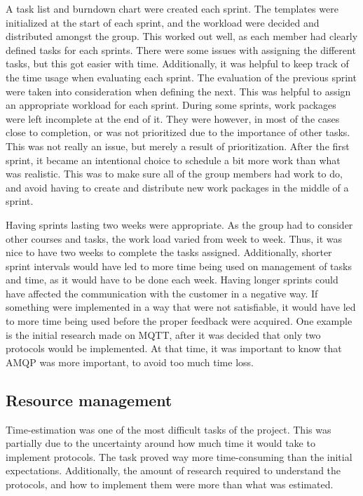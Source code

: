 A task list and burndown chart were created each sprint. The templates were initialized at the start of each sprint, and the workload were decided and distributed amongst the group. This worked out well, as each member had clearly defined tasks for each sprints. There were some issues with assigning the different tasks, but this got easier with time. Additionally, it was helpful to keep track of the time usage when evaluating each sprint. The evaluation of the previous sprint were taken into consideration when defining the next. This was helpful to assign an appropriate workload for each sprint. During some sprints, work packages were left incomplete at the end of it. They were however, in most of the cases close to completion, or was not prioritized due to the importance of other tasks. This was not really an issue, but merely a result of prioritization. After the first sprint, it became an intentional choice to schedule a bit more work than what was realistic. This was to make sure all of the group members had work to do, and avoid having to create and distribute new work packages in the middle of a sprint.

Having sprints lasting two weeks were appropriate. As the group had to consider other courses and tasks, the work load varied from week to week. Thus, it was nice to have two weeks to complete the tasks assigned. Additionally, shorter sprint intervals would have led to more time being used on management of tasks and time, as it would have to be done each week. Having longer sprints could have affected the communication with the customer in a negative way. If something were implemented in a way that were not satisfiable, it would have led to more time being used before the proper feedback were acquired. One example is the initial research made on MQTT, after it was decided that only two protocols would be implemented. At that time, it was important to know that AMQP was more important, to avoid too much time loss.

\subsection{Resource management}
\label{subsec:project_evaluation-development-time_management}

Time-estimation was one of the most difficult tasks of the project. This was partially due to the uncertainty around how much time it would take to implement protocols. The task proved way more time-consuming than the initial expectations. Additionally, the amount of research required to understand the protocols, and how to implement them were more than what was estimated.

